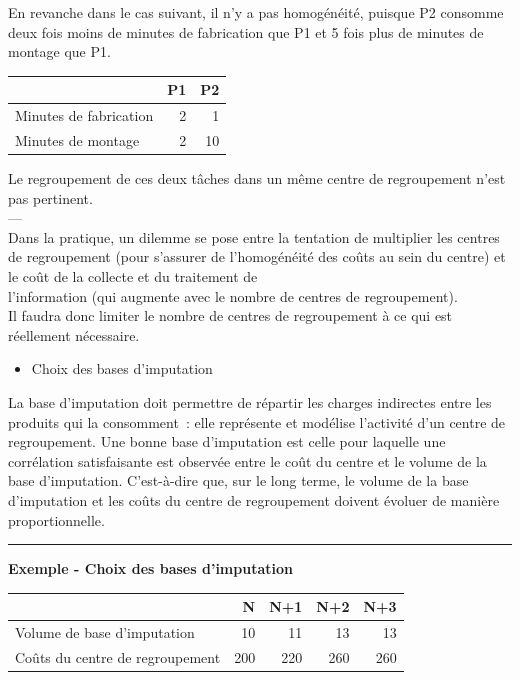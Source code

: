 \documentclass{kaobook}
\begin{document}
En revanche dans le cas suivant, il n'y a pas homogénéité, puisque P2 consomme deux fois moins de minutes de fabrication que P1 et 5 fois plus de minutes de montage que P1.\\

\begin{center}
\begin{tabular}{lrr}
 & P1 & P2\\
\hline
Minutes de fabrication & 2 & 1\\
Minutes de montage & 2 & 10\\
\end{tabular}
\end{center}

Le regroupement de ces deux tâches dans un même centre de regroupement n'est pas pertinent.\\
---\\

Dans la pratique, un dilemme se pose entre la tentation de multiplier les centres de regroupement (pour s'assurer de l'homogénéité des coûts au sein du centre) et le coût de la collecte et du traitement de\\
l'information (qui augmente avec le nombre de centres de regroupement).\\
Il faudra donc limiter le nombre de centres de regroupement à ce qui est réellement nécessaire.\\

\begin{itemize}
\item Choix des bases d'imputation\\
\end{itemize}
La base d'imputation doit permettre de répartir les charges indirectes entre les produits qui la consomment : elle représente et modélise l'activité d'un centre de regroupement. Une bonne base d'imputation est celle pour laquelle une corrélation satisfaisante est observée entre le coût du centre et le volume de la base d'imputation. C'est-à-dire que, sur le long terme, le volume de la base d'imputation et les coûts du centre de regroupement doivent évoluer de manière proportionnelle.\\

\noindent\rule{\textwidth}{0.5pt}
\textbf{Exemple - Choix des bases d'imputation}\\

\begin{center}
\begin{tabular}{lrrrr}
 & N & N+1 & N+2 & N+3\\
\hline
Volume de base d'imputation & 10 & 11 & 13 & 13\\
Coûts du centre de regroupement & 200 & 220 & 260 & 260\\
\end{tabular}
\end{center}
\end{document}
